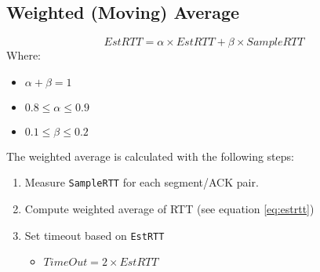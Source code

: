 \documentclass[11pt]{article}
\begin{document}
\subsection{Weighted (Moving) Average}
\label{sec:org8828f22}
\begin{equation}
\label{eq:estrtt}
EstRTT = \alpha \times EstRTT + \beta \times SampleRTT
\end{equation}
Where:
\begin{itemize}
\item \(\alpha + \beta = 1\)
\item \(0.8 \le \alpha \le 0.9\)
\item \(0.1 \le \beta \le 0.2\)
\end{itemize}
The weighted average is calculated with the following steps:
\begin{enumerate}
\item Measure \texttt{SampleRTT} for each segment/ACK pair.
\item Compute weighted average of RTT (see equation \eqref{eq:estrtt})
\item Set timeout based on \texttt{EstRTT}
\begin{itemize}
\item \(TimeOut = 2 \times EstRTT\)
\end{itemize}
\end{enumerate}
\end{document}
